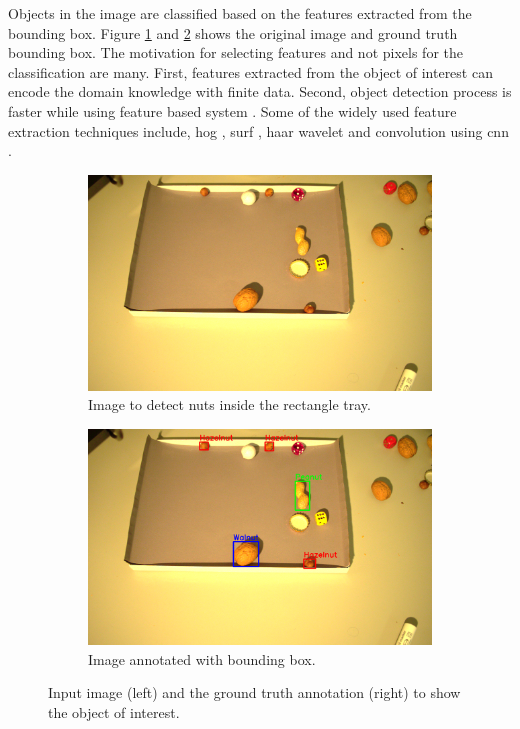 \documentclass[journal,onecolumn,12pt]{IEEEtran}
\begin{document}
Objects in the image are classified based on the features extracted from the bounding box. Figure \ref{fig:original_image_73} and \ref{fig:annotated_image_73_bb} shows the original image and ground truth bounding box. The motivation for selecting features and not pixels for the classification are many. First, features extracted from the object of interest can encode the domain knowledge with finite data. Second, object detection process is faster while using feature based system \cite{Viola2001}. Some of the widely used feature extraction techniques include, \gls{hog} \cite{Dalal2005}, \gls{surf} \cite{Herbert2006}, haar wavelet \cite{Viola2001} and convolution using \gls{cnn} \cite{Alex2012}.
\begin{figure}
   	\centering
   	\begin{subfigure}[b]{0.475\textwidth}
   		\centering
   		\includegraphics[width=\textwidth]{images/original_image_73}
   		\caption{Image to detect nuts inside the rectangle tray.}
   		\label{fig:original_image_73}
   	\end{subfigure}
   	\hfill
   	\begin{subfigure}[b]{0.475\textwidth}  
   		\centering 
   		\includegraphics[width=\textwidth]{images/annotated_image_73_bb}
   		\caption{Image annotated with bounding box.}   
   		\label{fig:annotated_image_73_bb}
   	\end{subfigure}
   	\caption{Input image (left) and the ground truth annotation (right) to show the object of interest.}
   	\label{fig:ground_truth}
\end{figure}
\end{document}
